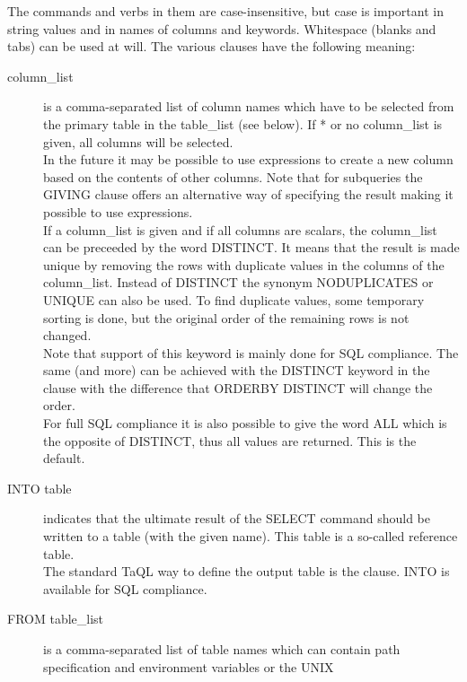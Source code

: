 The commands and verbs in them are
case-insensitive, but case is important in string values and
in names of columns and keywords. Whitespace (blanks and tabs) can
be used at will.
The various clauses have the following meaning:
\begin{description}
  \item[ column\_list]
       is a comma-separated list of column names which have to be selected
       from the primary table in the table\_list (see below).
       If * or no column\_list is given, all columns will be selected.
       \\In the future it may be possible to use expressions to create
       a new column based on the contents of other columns.
       Note that for subqueries the GIVING clause offers an
       alternative way of specifying the result making it
       possible to use expressions.
       \\If a column\_list is given and if all columns are scalars, the
       column\_list can be preceeded by the word DISTINCT.
       It means that the result is made unique by removing the rows
       with duplicate values in the columns of the column\_list.
       Instead of DISTINCT the synonym NODUPLICATES or UNIQUE can also
       be used.
       To find duplicate values, some temporary sorting is done,
       but the original order of the remaining rows is not changed.
       \\Note that support of this keyword is mainly done for SQL
       compliance. The same (and more) can be achieved with the
       DISTINCT keyword in the  clause
       with the difference that ORDERBY DISTINCT will change the order.
       \\For full SQL compliance it is also possible to give the word
       ALL which is the opposite of DISTINCT, thus all values are
       returned. This is the default.
  \item[ \label{TAQL:INTO}INTO table ]
       indicates that the ultimate result of the SELECT command should be
       written to a table (with the given name). This table is a
       so-called reference table.
       \\The standard TaQL way to define the output table is the
        clause. INTO is available
       for SQL compliance.
  \item[ \label{TAQL:TABLE_LIST}FROM table\_list ]
       is a comma-separated list of table names which can contain
       path specification and environment variables or the UNIX

\end{description}
